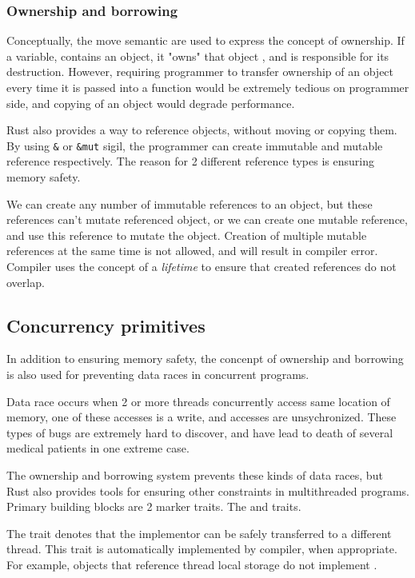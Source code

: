 \subsubsection{Ownership and borrowing}
Conceptually, the move semantic are used to express the concept of ownership. If a variable, contains an object, it "owns"
that object , and is responsible for its destruction. However, requiring programmer to transfer ownership of an object every time
it is passed into a function would be extremely tedious on programmer side, and copying of an object would degrade performance.

Rust also provides a way to reference objects, without moving or copying them. By using \verb|&| or
\verb|&mut| sigil, the programmer can create immutable and mutable reference respectively. The reason for 2 different
reference types is ensuring memory safety.

We can create any number of immutable references to an object, but these references can't mutate referenced object, or
we can create one mutable reference, and use this reference to mutate the object. Creation of multiple mutable references
at the same time is not allowed, and will result in compiler error. Compiler uses the concept of a \textit{lifetime} to ensure that created
references do not overlap.

\subsection{Concurrency primitives}
In addition to ensuring memory safety, the concenpt of ownership and borrowing is also used for preventing data
races in concurrent programs.

Data race occurs when 2 or more threads concurrently access same location of memory, one of these accesses is a write,
and accesses are unsychronized. These types of bugs are extremely hard to discover, and have lead to death of several medical patients in
one extreme case\cite{article:therac}.

The ownership and borrowing system prevents these kinds of data races, but Rust also provides tools for ensuring other
constraints in multithreaded programs. Primary building blocks are 2 marker traits. The  and  traits.

The  trait denotes that the implementor can be safely transferred to a different thread. This trait is automatically
implemented by compiler, when appropriate. For example, objects that reference thread local storage do not implement .

